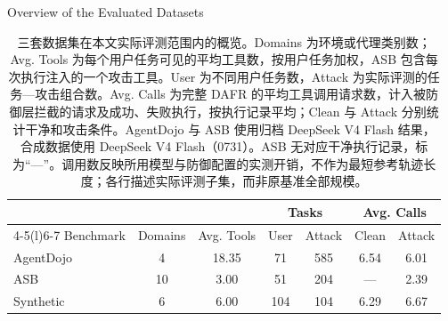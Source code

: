 \documentclass[UTF8]{ctexart}
\begin{document}
\begin{table}[ht]\centering
{\large Overview of the Evaluated Datasets}\par\medskip
\renewcommand{\arraystretch}{1.25}
\begin{tabular*}{.98\linewidth}{@{\extracolsep{\fill}}lcccccc@{}}
\toprule
 & & & \multicolumn{2}{c}{Tasks} & \multicolumn{2}{c}{Avg. Calls} \\
\cmidrule(lr){4-5}\cmidrule(l){6-7}
Benchmark & Domains & Avg. Tools & User & Attack & Clean & Attack \\
\midrule
AgentDojo & 4 & 18.35 & 71 & 585 & 6.54 & 6.01 \\
ASB & 10 & 3.00 & 51 & 204 & — & 2.39 \\
Synthetic & 6 & 6.00 & 104 & 104 & 6.29 & 6.67 \\
\bottomrule\end{tabular*}
\caption{三套数据集在本文实际评测范围内的概览。Domains 为环境或代理类别数；Avg. Tools 为每个用户任务可见的平均工具数，按用户任务加权，ASB 包含每次执行注入的一个攻击工具。User 为不同用户任务数，Attack 为实际评测的任务—攻击组合数。Avg. Calls 为完整 DAFR 的平均工具调用请求数，计入被防御层拦截的请求及成功、失败执行，按执行记录平均；Clean 与 Attack 分别统计干净和攻击条件。AgentDojo 与 ASB 使用归档 DeepSeek V4 Flash 结果，合成数据使用 DeepSeek V4 Flash（0731）。ASB 无对应干净执行记录，标为“—”。调用数反映所用模型与防御配置的实测开销，不作为最短参考轨迹长度；各行描述实际评测子集，而非原基准全部规模。}
\end{table}
\end{document}
